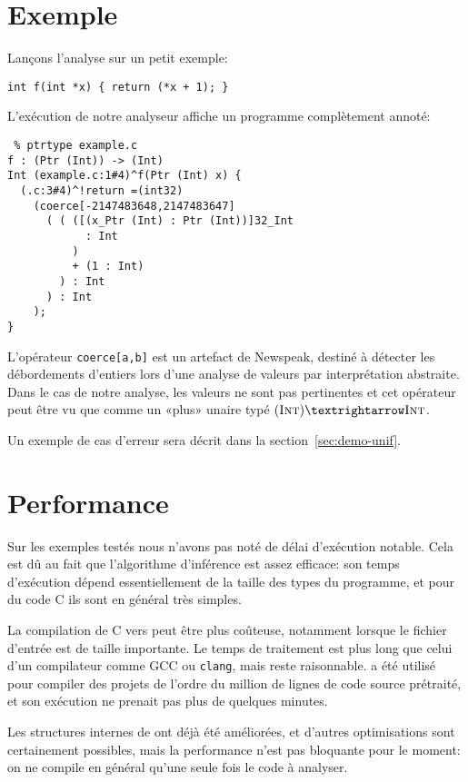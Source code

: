 \section{Exemple}

Lançons l'analyse sur un petit exemple:

\begin{verbatim}
int f(int *x) { return (*x + 1); }
\end{verbatim}

L'exécution de notre analyseur affiche un programme complètement annoté:

\begin{verbatim}
 % ptrtype example.c
f : (Ptr (Int)) -> (Int)
Int (example.c:1#4)^f(Ptr (Int) x) {
  (.c:3#4)^!return =(int32)
    (coerce[-2147483648,2147483647]
      ( ( ([(x_Ptr (Int) : Ptr (Int))]32_Int
            : Int
          )
          + (1 : Int)
        ) : Int
      ) : Int
    );
}
\end{verbatim}

L'opérateur \texttt{coerce[a,b]} est un artefact de Newspeak, destiné à détecter
les débordements d'entiers lors d'une analyse de valeurs par interprétation
abstraite. Dans le cas de notre analyse, les valeurs ne sont pas pertinentes et
cet opérateur peut être vu que comme un «plus» unaire typé $(\tInt) → \tInt$.

Un exemple de cas d'erreur sera décrit dans la section~\ref{sec:demo-unif}.

\section{Performance}

Sur les exemples testés nous n'avons pas noté de délai d'exécution notable. Cela
est dû au fait que l'algorithme d'inférence est assez efficace: son temps
d'exécution dépend essentiellement de la taille des types du programme, et pour
du code C ils sont en général très simples.

La compilation de C vers \newspeak peut être plus coûteuse, notamment lorsque
le fichier d'entrée est de taille importante. Le temps de traitement est plus
long que celui d'un compilateur comme GCC ou \texttt{clang}, mais reste
raisonnable. \ctonewspeak a été utilisé pour compiler des projets de l'ordre du
million de lignes de code source prétraité, et son exécution ne prenait pas plus
de quelques minutes.

Les structures internes de \ctonewspeak ont déjà été améliorées, et d'autres
optimisations sont certainement possibles, mais la performance n'est pas
bloquante pour le moment: on ne compile en général qu'une seule fois le code à
analyser.

